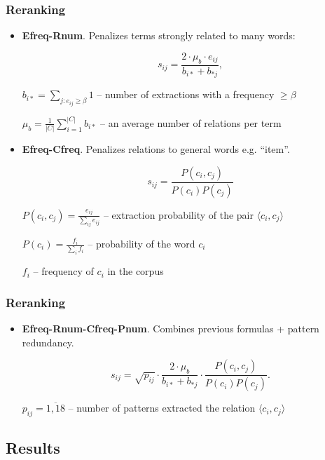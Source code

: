 \documentclass{beamer}
\begin{document}
\begin{frame}
\frametitle{Reranking }

\begin{itemize}
\item \textbf{Efreq-Rnum}. Penalizes terms strongly related to many words:

$$s_{ij} = \frac{2\cdot\mu_b \cdot e_{ij}}{b_{i*} + b_{*j}}, $$

$b_{i*} = \sum_{j:e_{ij} \geq \beta} 1$ -- number of extractions with a frequency $\geq \beta$

$\mu_b = \frac{1}{|C|}\sum_{i=1}^{|C|} b_{i*}$ -- an average number of relations per term

\item \textbf{Efreq-Cfreq}. Penalizes relations to general words e.g. ``item''. 

$$s_{ij} = \frac{P(c_i,c_j)}{P(c_i)P(c_j)}$$

$P(c_i,c_j)=\frac{e_{ij}}{\sum_{ij}e_{ij}}$ -- extraction probability of the pair $\langle c_i,c_j \rangle$

$P(c_i)= \frac{f_i}{\sum_i f_i}$ -- probability of the word $c_i$

$f_i$ -- frequency of $c_i$ in the corpus

 
 
\end{itemize}

\end{frame}


\begin{frame}
\frametitle{Reranking }

\begin{itemize}
  
\item \textbf{Efreq-Rnum-Cfreq-Pnum}. Combines previous formulas + pattern redundancy. 

$$s_{ij} = \sqrt{p_{ij}} \cdot \frac{2\cdot\mu_b }{b_{i*}+b_{*j}} \cdot \frac{P(c_i,c_j)}{P(c_i)P(c_j)}.$$

 $p_{ij} = \overline{1,18}$ -- number of patterns extracted the relation $\langle c_i, c_j \rangle$
 
\end{itemize}

\end{frame}





\subsection{Results}
\end{document}

